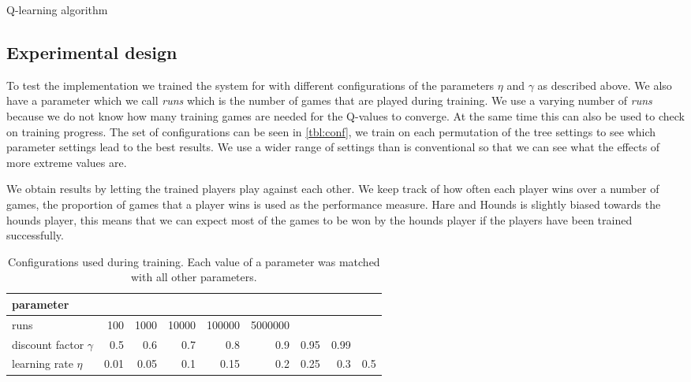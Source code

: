 \begin{algorithm}
\caption{Q-learning algorithm\cite{alpaydin}}
\label{alg:Qlearning}
\begin{algorithmic}[1]
	\Repeat
\EndFor
\end{algorithmic}
\end{algorithm}

\subsection{Experimental design}
To test the implementation we trained the system for with different
configurations of the parameters $\eta$ and $\gamma$ as described above. We
also have a parameter which we call \emph{runs} which is the number of games
that are played during training. We use a varying number of \emph{runs}
because we do not know how many training games are needed for the Q-values to
converge. At the same time this can also be used to check on training progress.
The set of configurations can be seen in \autoref{tbl:conf}, we train on each
permutation of the tree settings to see which parameter settings lead to the
best results. We use a wider range of settings than is conventional so that we
can see what the effects of more extreme values are.

We obtain results by letting the trained players play against each other. We
keep track of how often each player wins over a number of games, the
proportion of games that a player wins is used as the performance measure. Hare
and Hounds is slightly biased towards the hounds player, this means that we can
expect most of the games to be won by the hounds player if the players have
been trained successfully.

\begin{table}
    \centering
    \caption{Configurations used during training. Each value of a parameter
        was matched with all other parameters.}
    \label{tbl:conf}
    \begin{tabular}{l|rrrrrrrr}
        \hline
        parameter & \\
        \hline
        runs & 100 & 1000 & 10000 & 100000 & 5000000 \\
        discount factor $\gamma$ & 0.5 & 0.6 & 0.7 & 0.8 & 0.9 & 0.95 &
        0.99 \\
        learning rate $\eta$ & 0.01 & 0.05 & 0.1 & 0.15 & 0.2 & 0.25 & 0.3
        & 0.5 \\
        \hline
    \end{tabular}
\end{table}
